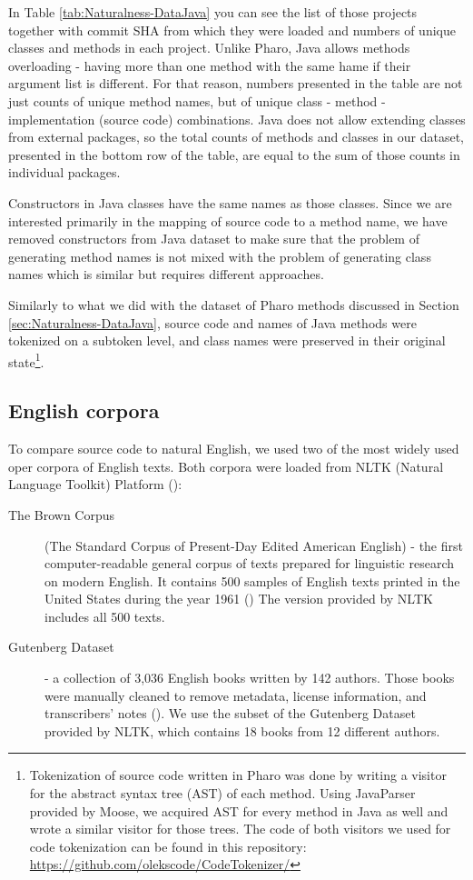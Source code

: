In Table \ref{tab:Naturalness-DataJava} you can see the list of those projects together with commit SHA from which they were loaded and numbers of unique classes and methods in each project. Unlike Pharo, Java allows methods overloading - having more than one method with the same hame if their argument list is different. For that reason, numbers presented in the table are not just counts of unique method names, but of unique class - method - implementation (source code) combinations. Java does not allow extending classes from external packages, so the total counts of methods and classes in our dataset, presented in the bottom row of the table, are equal to the sum of those counts in individual packages.

Constructors in Java classes have the same names as those classes. Since we are interested primarily in the mapping of source code to a method name, we have removed constructors from Java dataset to make sure that the problem of generating method names is not mixed with the problem of generating class names which is similar but requires different approaches.

Similarly to what we did with the dataset of Pharo methods discussed in Section \ref{sec:Naturalness-DataJava}, source code and names of Java methods were tokenized on a subtoken level, and class names were preserved in their original state\footnote{Tokenization of source code written in Pharo was done by writing a visitor for the abstract syntax tree (AST) of each method. Using JavaParser provided by Moose, we acquired AST for every method in Java as well and wrote a similar visitor for those trees. The code of both visitors we used for code tokenization can be found in this repository: \url{https://github.com/olekscode/CodeTokenizer/}}.

\subsection{English corpora}
\label{sec:Naturalness-DataEnglish}

To compare source code to natural English, we used two of the most widely used oper corpora of English texts. Both corpora were loaded from NLTK (Natural Language Toolkit) Platform (\cite{Bird09}):

\begin{description}
  \item [The Brown Corpus] (The Standard Corpus of Present-Day Edited American English) - the first computer-readable general corpus of texts prepared for linguistic research on modern English. It contains 500 samples of English texts printed in the United States during the year 1961 (\cite{Kuce79}) The version provided by NLTK includes all 500 texts.
  \item [Gutenberg Dataset] - a collection of 3,036 English books written by 142 authors. Those books were manually cleaned to remove metadata, license information, and transcribers' notes (\cite{Lahi14}). We use the subset of the Gutenberg Dataset provided by NLTK, which contains 18 books from 12 different authors.
\end{description}

